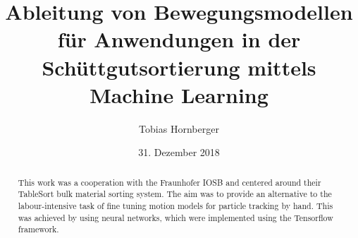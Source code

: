 \documentclass[german]{isasthesis}
\title{Ableitung von Bewegungsmodellen für Anwendungen in der Schüttgutsortierung mittels Machine Learning}
\author{Tobias Hornberger}
\date{31. Dezember 2018}
\begin{document}
    \maketitle

    \begin{abstract}
        This work was a cooperation with the Fraunhofer IOSB and centered around their TableSort bulk material sorting system.
        The aim was to provide an alternative to the labour-intensive task of fine tuning motion models for particle tracking by hand. 
        This was achieved by using neural networks, which were implemented using the Tensorflow framework. 
    \end{abstract}

    \maketoc

    
    
    
    
    
    
    


    \nocite{*}
	\cleardoublepage
    \printbibliography %


    \appendix
    
\end{document}
